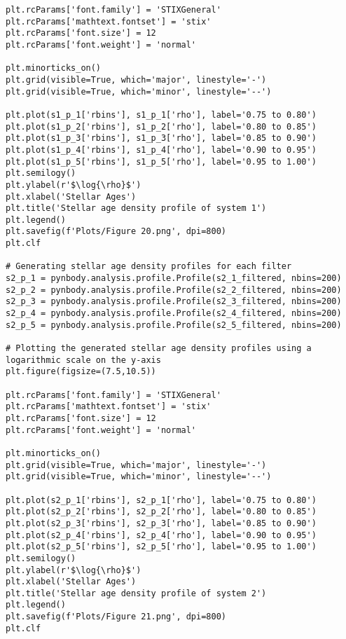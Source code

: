 \documentclass[12pt, a4paper]{article}
\begin{document}
\begin{lstlisting}[language=iPython]
plt.rcParams['font.family'] = 'STIXGeneral'
plt.rcParams['mathtext.fontset'] = 'stix'
plt.rcParams['font.size'] = 12
plt.rcParams['font.weight'] = 'normal'

plt.minorticks_on()
plt.grid(visible=True, which='major', linestyle='-')
plt.grid(visible=True, which='minor', linestyle='--')

plt.plot(s1_p_1['rbins'], s1_p_1['rho'], label='0.75 to 0.80')
plt.plot(s1_p_2['rbins'], s1_p_2['rho'], label='0.80 to 0.85')
plt.plot(s1_p_3['rbins'], s1_p_3['rho'], label='0.85 to 0.90')
plt.plot(s1_p_4['rbins'], s1_p_4['rho'], label='0.90 to 0.95')
plt.plot(s1_p_5['rbins'], s1_p_5['rho'], label='0.95 to 1.00')
plt.semilogy()
plt.ylabel(r'$\log{\rho}$')
plt.xlabel('Stellar Ages')
plt.title('Stellar age density profile of system 1')
plt.legend()
plt.savefig(f'Plots/Figure 20.png', dpi=800)
plt.clf

# Generating stellar age density profiles for each filter
s2_p_1 = pynbody.analysis.profile.Profile(s2_1_filtered, nbins=200)
s2_p_2 = pynbody.analysis.profile.Profile(s2_2_filtered, nbins=200)
s2_p_3 = pynbody.analysis.profile.Profile(s2_3_filtered, nbins=200)
s2_p_4 = pynbody.analysis.profile.Profile(s2_4_filtered, nbins=200)
s2_p_5 = pynbody.analysis.profile.Profile(s2_5_filtered, nbins=200)

# Plotting the generated stellar age density profiles using a logarithmic scale on the y-axis
plt.figure(figsize=(7.5,10.5))

plt.rcParams['font.family'] = 'STIXGeneral'
plt.rcParams['mathtext.fontset'] = 'stix'
plt.rcParams['font.size'] = 12
plt.rcParams['font.weight'] = 'normal'

plt.minorticks_on()
plt.grid(visible=True, which='major', linestyle='-')
plt.grid(visible=True, which='minor', linestyle='--')
  
plt.plot(s2_p_1['rbins'], s2_p_1['rho'], label='0.75 to 0.80')
plt.plot(s2_p_2['rbins'], s2_p_2['rho'], label='0.80 to 0.85')
plt.plot(s2_p_3['rbins'], s2_p_3['rho'], label='0.85 to 0.90')
plt.plot(s2_p_4['rbins'], s2_p_4['rho'], label='0.90 to 0.95')
plt.plot(s2_p_5['rbins'], s2_p_5['rho'], label='0.95 to 1.00')
plt.semilogy()
plt.ylabel(r'$\log{\rho}$')
plt.xlabel('Stellar Ages')
plt.title('Stellar age density profile of system 2')
plt.legend()
plt.savefig(f'Plots/Figure 21.png', dpi=800)
plt.clf

\end{lstlisting}
\end{document}
